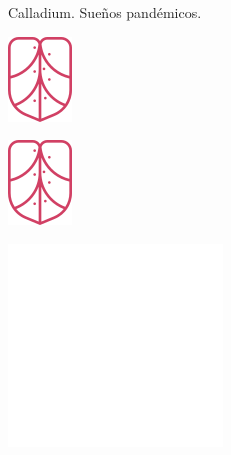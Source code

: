 \documentclass[12pt]{book}
\newcommand\nbvspace[1][3]{\vspace*{\stretch{#1}}}
\begin{document}
\pagecolor{lowpink}
\color{deeppink}

\begin{colophon} 
Calladium. Sueños pandémicos.
\end{colophon}


\newpage
\thispagestyle{empty}

\includegraphics{cal_rosa.png}

\newpage
\pagecolor{titlepagecolor}
\includegraphics{cal_rosa.png}
\newpage

\pagecolor{titlepagecolor}
\nbvspace[3]
\hfill\includegraphics{cal-blanco-texto.png}\hfill
\nbvspace[3]

\end{document}
